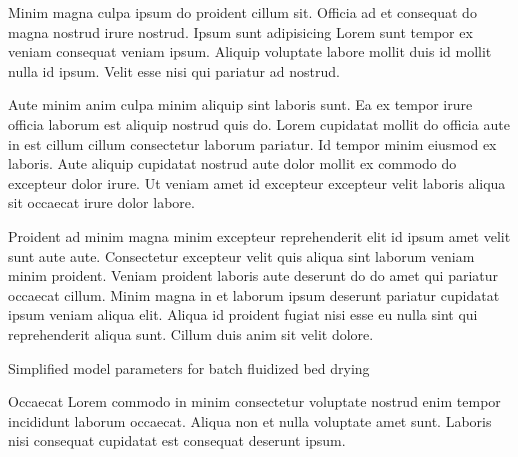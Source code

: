 Minim magna culpa ipsum do proident cillum sit. Officia ad et consequat do magna nostrud irure nostrud. Ipsum sunt adipisicing Lorem sunt tempor ex veniam consequat veniam ipsum. Aliquip voluptate labore mollit duis id mollit nulla id ipsum. Velit esse nisi qui pariatur ad nostrud.

Aute minim anim culpa minim aliquip sint laboris sunt. Ea ex tempor irure officia laborum est aliquip nostrud quis do. Lorem cupidatat mollit do officia aute in est cillum cillum consectetur laborum pariatur. Id tempor minim eiusmod ex laboris. Aute aliquip cupidatat nostrud aute dolor mollit ex commodo do excepteur dolor irure. Ut veniam amet id excepteur excepteur velit laboris aliqua sit occaecat irure dolor labore.

Proident ad minim magna minim excepteur reprehenderit elit id ipsum amet velit sunt aute aute. Consectetur excepteur velit quis aliqua sint laborum veniam minim proident. Veniam proident laboris aute deserunt do do amet qui pariatur occaecat cillum. Minim magna in et laborum ipsum deserunt pariatur cupidatat ipsum veniam aliqua elit. Aliqua id proident fugiat nisi esse eu nulla sint qui reprehenderit aliqua sunt. Cillum duis anim sit velit dolore.

\begin{table}[tb]
	\caption{Simplified model parameters for batch fluidized bed drying}
	\label{tab.simple_params}
	\centering
	
\end{table}

Occaecat Lorem commodo in minim consectetur voluptate nostrud enim tempor incididunt laborum occaecat. Aliqua non et nulla voluptate amet sunt. Laboris nisi consequat cupidatat est consequat deserunt ipsum.
